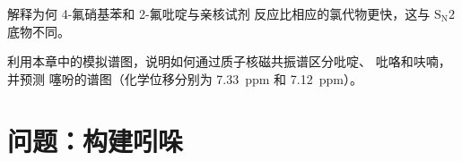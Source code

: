 \begin{exercise}[$\star\star\star$]\label{exo:b3:heterocycles:11}
解释为何 4-氟硝基苯和 2-氟吡啶与亲核试剂
反应比相应的氯代物更快，这与 $\mathrm S_\mathrm N2$ 底物不同。
\end{exercise}

\begin{exercise}[$\star\star\star$]\label{exo:b3:heterocycles:12}
利用本章中的模拟谱图，说明如何通过质子核磁共振谱区分吡啶、
吡咯和呋喃，并预测
噻吩的谱图（化学位移分别为 \qty{7.33}{ppm} 和 \qty{7.12}{ppm}）。
\end{exercise}

\section{问题：构建吲哚}

